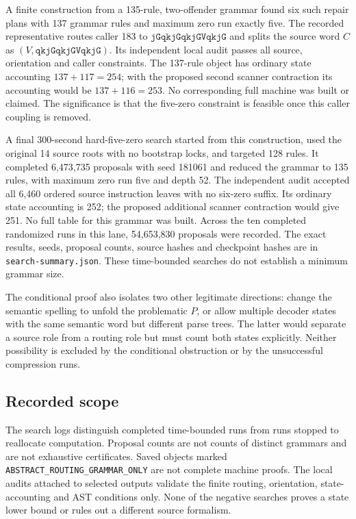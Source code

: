 A finite construction from a 135-rule, two-offender grammar found six
such repair plans with 137 grammar rules and maximum zero run exactly
five.  The recorded representative routes caller 183 to
$\mathtt{jGqkjGqkjGVqkjG}$ and splits the source word $C$ as
$(V,\mathtt{qkjGqkjGVqkjG})$.  Its independent local audit passes all source,
orientation and caller constraints.  The 137-rule object has ordinary
state accounting $137+117=254$; with the proposed second scanner
contraction its accounting would be $137+116=253$.  No corresponding full
machine was built or claimed.  The significance is that the five-zero
constraint is feasible once this caller coupling is removed.

A final 300-second hard-five-zero search started from this construction,
used the original 14 source roots with no bootstrap locks, and targeted
128 rules.  It completed 6,473,735 proposals with seed 181061 and reduced
the grammar to 135 rules, with maximum zero run five and depth 52.
The independent audit accepted all 6,460 ordered source instruction
leaves with no six-zero suffix.  Its ordinary state accounting is 252;
the proposed additional scanner contraction would give 251.  No full
table for this grammar was built.  Across the ten completed randomized
runs in this lane, 54,653,830 proposals were recorded.  The exact results,
seeds, proposal counts, source hashes and checkpoint hashes are in
\texttt{search-summary.json}.  These time-bounded searches do not
establish a minimum grammar size.

The conditional proof also isolates two other legitimate directions:
change the semantic spelling to unfold the problematic $P$, or allow
multiple decoder states with the same semantic word but different parse
trees.  The latter would separate a source role from a routing role but
must count both states explicitly.  Neither possibility is excluded by
the conditional obstruction or by the unsuccessful compression runs.

\subsection{Recorded scope}
The search logs distinguish completed time-bounded runs from runs stopped
to reallocate computation.  Proposal counts are not counts of distinct
grammars and are not exhaustive certificates.  Saved objects marked
\texttt{ABSTRACT\_ROUTING\_GRAMMAR\_ONLY} are not complete machine proofs.
The local audits attached to selected outputs validate the finite routing,
orientation, state-accounting and AST conditions only.  None of the
negative searches proves a state lower bound or rules out a different
source formalism.
